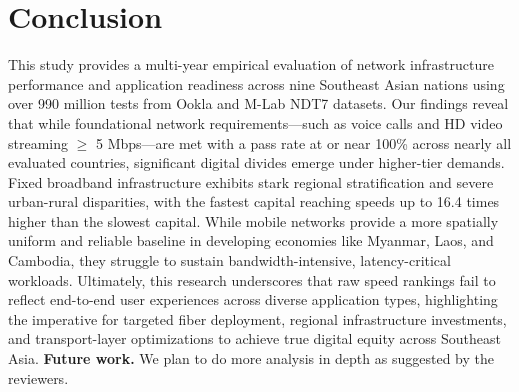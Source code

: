 \documentclass[sigconf,nonacm]{acmart}
\begin{document}
\section{Conclusion}
This study provides a multi-year empirical evaluation of network
infrastructure performance and application readiness across nine
Southeast Asian nations using over 990 million tests from Ookla and M-Lab
NDT7 datasets. Our findings reveal that while foundational network
requirements---such as voice calls and HD video streaming $\geq$ 5
Mbps---are met with a pass rate at or near 100\% across nearly all
evaluated countries, significant digital divides emerge under higher-tier
demands.
Fixed broadband infrastructure exhibits stark regional stratification and
severe urban-rural disparities, with the fastest capital reaching speeds
up to 16.4 times higher than the slowest capital. While mobile
networks provide a more spatially uniform and reliable baseline in
developing economies like Myanmar, Laos, and Cambodia, they struggle to
sustain bandwidth-intensive, latency-critical workloads. Ultimately, this
research underscores that raw speed rankings fail to reflect end-to-end
user experiences across diverse application types, highlighting the
imperative for targeted fiber deployment, regional infrastructure
investments, and transport-layer optimizations to achieve true digital
equity across Southeast Asia.
\textbf{Future work.} We plan to do more analysis in depth as suggested by
the reviewers.



\end{document}

